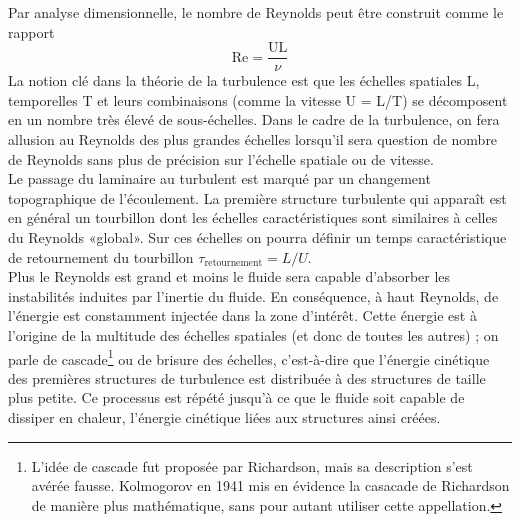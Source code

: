 \documentclass[a4paper,12pt]{article}
\newcommand{\cad}{c'est-à-dire}
\numberwithin{equation}{section} %
\begin{document}
\noindent  Par analyse dimensionnelle, le nombre de Reynolds peut être construit comme le rapport 
\begin{equation}
 \text{Re} = \frac{\text{UL}}{\nu}
\end{equation} 
 La notion clé dans la théorie de la turbulence est que les échelles spatiales L, temporelles T et leurs combinaisons (comme la vitesse U = L/T) se décomposent en un nombre très élevé de sous-échelles.
Dans le cadre de la turbulence, on fera allusion au Reynolds des plus grandes échelles lorsqu'il sera question de nombre de Reynolds sans plus de précision sur l'échelle spatiale ou de vitesse. \\
Le passage du laminaire au turbulent est marqué par un changement topographique de l'écoulement. La première structure turbulente qui apparaît est en général un tourbillon dont les échelles caractéristiques sont similaires à celles du Reynolds «global». Sur ces échelles on pourra définir un temps caractéristique de retournement du tourbillon $\tau_{\text{retournement}} = L/U$. \\
Plus le Reynolds est grand et moins le fluide sera capable d'absorber les instabilités induites par l'inertie du fluide. En conséquence, à haut Reynolds, de l'énergie est constamment injectée dans la zone d'intérêt. Cette énergie est à l'origine de la multitude des échelles spatiales (et donc de toutes les autres) ; on parle de cascade\footnote{L'idée de cascade fut proposée par Richardson, mais sa description s'est avérée fausse. Kolmogorov en 1941 mis en évidence la casacade de Richardson de manière plus mathématique, sans pour autant utiliser cette appellation.} ou de brisure des échelles, \cad $ $ que l'énergie cinétique des premières structures de turbulence est distribuée à des structures de taille plus petite. Ce processus est répété jusqu'à ce que le fluide soit capable de dissiper en chaleur, l'énergie cinétique liées aux structures ainsi créées. \\
\end{document}
